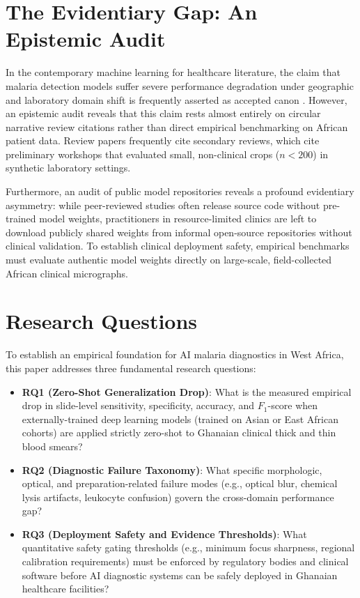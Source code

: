 \documentclass[10pt,journal,compsoc]{IEEEtran}
\begin{document}
\section{The Evidentiary Gap: An Epistemic Audit}
In the contemporary machine learning for healthcare literature, the claim that malaria detection models suffer severe performance degradation under geographic and laboratory domain shift is frequently asserted as accepted canon \cite{kabore2025addressing}. However, an epistemic audit reveals that this claim rests almost entirely on circular narrative review citations rather than direct empirical benchmarking on African patient data. Review papers frequently cite secondary reviews, which cite preliminary workshops that evaluated small, non-clinical crops ($n < 200$) in synthetic laboratory settings.

Furthermore, an audit of public model repositories reveals a profound evidentiary asymmetry: while peer-reviewed studies often release source code without pre-trained model weights, practitioners in resource-limited clinics are left to download publicly shared weights from informal open-source repositories without clinical validation. To establish clinical deployment safety, empirical benchmarks must evaluate authentic model weights directly on large-scale, field-collected African clinical micrographs.

\section{Research Questions}
To establish an empirical foundation for AI malaria diagnostics in West Africa, this paper addresses three fundamental research questions:
\begin{itemize}
    \item \textbf{RQ1 (Zero-Shot Generalization Drop)}: What is the measured empirical drop in slide-level sensitivity, specificity, accuracy, and $F_1$-score when externally-trained deep learning models (trained on Asian or East African cohorts) are applied strictly zero-shot to Ghanaian clinical thick and thin blood smears?
    \item \textbf{RQ2 (Diagnostic Failure Taxonomy)}: What specific morphologic, optical, and preparation-related failure modes (e.g., optical blur, chemical lysis artifacts, leukocyte confusion) govern the cross-domain performance gap?
    \item \textbf{RQ3 (Deployment Safety and Evidence Thresholds)}: What quantitative safety gating thresholds (e.g., minimum focus sharpness, regional calibration requirements) must be enforced by regulatory bodies and clinical software before AI diagnostic systems can be safely deployed in Ghanaian healthcare facilities?
\end{itemize}
\end{document}
